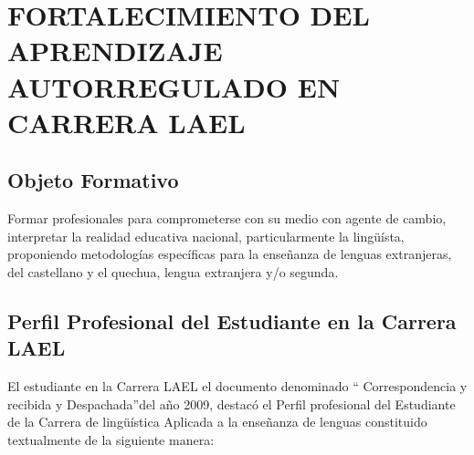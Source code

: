 \chapter{FORTALECIMIENTO DEL APRENDIZAJE AUTORREGULADO EN CARRERA LAEL}

\section{Objeto Formativo}

Formar profesionales para comprometerse con su medio con agente de cambio, 
interpretar la realidad educativa nacional, particularmente la ling\"{u}\'{i}sta,
proponiendo metodolog\'{i}as espec\'{i}ficas para la ense\~{n}anza de lenguas
extranjeras, del castellano y el quechua, lengua extranjera y/o segunda.

\section{Perfil Profesional del Estudiante en la Carrera LAEL}

El estudiante en la Carrera LAEL el documento denominado \textquotedblleft 
Correspondencia y recibida y Despachada\textquotedblright del a\~{n}o 2009,
destac\'{o} el Perfil profesional del Estudiante de la Carrera de 
ling\"{u}\'{i}stica Aplicada a la ense\~{n}anza de lenguas constituido textualmente
de la siguiente manera:

